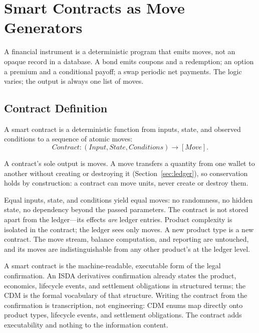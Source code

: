 \section{Smart Contracts as Move Generators}
\label{sec:sec06}
\label{sec:contracts}

A financial instrument is a deterministic program that emits moves, not an opaque record in a database. A bond emits coupons and a redemption; an option a premium and a conditional payoff; a swap periodic net payments. The logic varies; the output is always one list of moves.

\subsection{Contract Definition}

\begin{definition}
A smart contract is a deterministic function from inputs, state, and observed conditions to a sequence of atomic moves:
\[
\textit{Contract} : (\textit{Input}, \textit{State}, \textit{Conditions}) \to [\textit{Move}].
\]
\end{definition}

\noindent A contract's sole output is moves. A move transfers a quantity from one wallet to another without creating or destroying it (Section~\ref{sec:ledger}), so conservation holds by construction: a contract can move units, never create or destroy them.

\noindent Equal inputs, state, and conditions yield equal moves: no randomness, no hidden state, no dependency beyond the passed parameters. The contract is not stored apart from the ledger---its effects \emph{are} ledger entries. Product complexity is isolated in the contract; the ledger sees only moves. A new product type is a new contract. The move stream, balance computation, and reporting are untouched, and its moves are indistinguishable from any other product's at the ledger level.

A smart contract is the machine-readable, executable form of the legal confirmation. An ISDA derivatives confirmation already states the product, economics, lifecycle events, and settlement obligations in structured terms; the CDM is the formal vocabulary of that structure. Writing the contract from the confirmation is transcription, not engineering: CDM enums map directly onto product types, lifecycle events, and settlement obligations. The contract adds executability and nothing to the information content.

